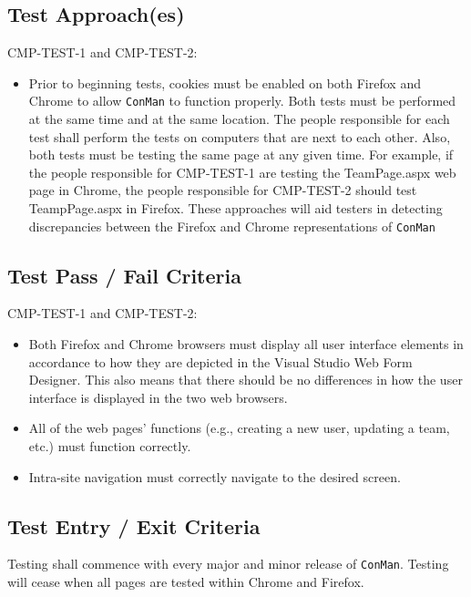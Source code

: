 \documentclass{article}
\begin{document}
\subsection{Test Approach(es)}
CMP-TEST-1 and CMP-TEST-2:
\begin{itemize}
\item Prior to beginning tests, cookies must be enabled on both Firefox and Chrome 
to allow \texttt{ConMan} to function properly.\newline \newline
Both tests must be performed at the same time and at the same location. 
The people responsible for each test shall perform the tests on computers that 
are next to each other. Also, both tests must be testing the same page at any given 
time. For example, if the people responsible for CMP-TEST-1 are testing the 
TeamPage.aspx web page in Chrome, the people responsible for CMP-TEST-2 should test 
TeampPage.aspx in Firefox.\newline \newline
	These approaches will aid testers in detecting discrepancies between the Firefox and Chrome representations of \texttt{ConMan}
\end{itemize}


\subsection{Test Pass / Fail Criteria}
CMP-TEST-1 and CMP-TEST-2:
\begin{itemize}
\item Both Firefox and Chrome browsers must display all user interface elements 
in accordance to how they are depicted in the Visual Studio Web Form Designer. This 
also means that there should be no differences in how the user interface is displayed 
in the two web browsers.
\item All of the web pages' functions (e.g., creating a new user, updating a team, etc.) must 
function correctly.
\item Intra-site navigation must correctly navigate to the desired screen.
\end{itemize}

\subsection{Test Entry / Exit Criteria}
Testing shall commence with every major and minor release of \texttt{ConMan}. Testing 
will cease when all pages are tested within Chrome and Firefox.
\end{document}
